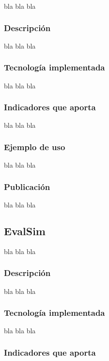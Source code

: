 bla bla bla

\subsubsection{Descripción}

bla bla bla

\subsubsection{Tecnología implementada}

bla bla bla

\subsubsection{Indicadores que aporta}

bla bla bla

\subsubsection{Ejemplo de uso}

bla bla bla

\subsubsection{Publicación}

bla bla bla

\subsection{EvalSim}

bla bla bla

\subsubsection{Descripción}

bla bla bla

\subsubsection{Tecnología implementada}

bla bla bla

\subsubsection{Indicadores que aporta}

